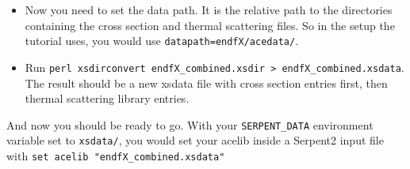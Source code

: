\documentclass[12pt, letterpaper]{article}
\begin{document}
\begin{itemize}
\begin{verbatim}
datapath=PATH
atomic weight ratios
[rest of xsdir here]
\end{verbatim}
\item Now you need to set the data path.  It is the relative path to the directories containing the cross section and thermal scattering files.  So in the setup the tutorial uses, you would use \verb|datapath=endfX/acedata/|.
\item Run \verb|perl xsdirconvert endfX_combined.xsdir > endfX_combined.xsdata|.  The result should be a new xsdata file with cross section entries first, then thermal scattering library entries.
\end{itemize}

And now you should be ready to go.  With your \verb|SERPENT_DATA| environment variable set to \verb|xsdata/|, you would set your acelib inside a Serpent2 input file with \verb|set acelib "endfX_combined.xsdata"|
\end{document}
